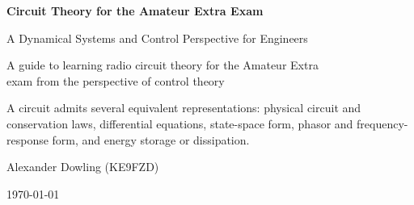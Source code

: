 \begin{titlepage}
\centering
\vspace*{0.8in}
{\Huge\bfseries Circuit Theory for the Amateur Extra Exam\par}
\vspace{0.35in}
{\Large A Dynamical Systems and Control Perspective for Engineers\par}
\vspace{0.8in}
{\large A guide to learning radio circuit theory for the Amateur Extra\\
exam from the perspective of control theory\par}
\vfill
\begin{tcolorbox}[width=0.82\textwidth,colback=white,colframe=GuideBlue,title=\textbf{Central Framework}]
A circuit admits several equivalent representations: physical circuit and
conservation laws, differential equations, state-space form, phasor and
frequency-response form, and energy storage or dissipation.
\end{tcolorbox}
\vfill
{\large Alexander Dowling (KE9FZD)\par}
{\large \today\par}
\end{titlepage}
